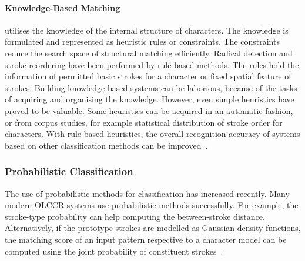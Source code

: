 \paragraph{Knowledge-Based Matching} utilises the knowledge of the internal 
structure of characters. The knowledge is formulated and represented as heuristic
rules or constraints. The constraints reduce the search space of structural 
matching efficiently. Radical detection and stroke reordering have been performed
by rule-based methods. The rules hold the information of permitted basic strokes
for a character or fixed spatial feature of strokes.
Building knowledge-based systems can be laborious, because of the tasks of 
acquiring and organising the knowledge. However, even simple heuristics have
proved to be valuable. Some heuristics can be acquired in an automatic fashion,
or from corpus studies, for example statistical distribution of stroke order for
characters. With rule-based heuristics, the overall recognition accuracy of
systems based on other classification methods can be 
improved~.

\subsubsection{Probabilistic Classification}
\label{sec:olccr:probabilisticclassification}

The use of probabilistic methods for classification has increased recently. Many modern 
OLCCR systems use probabilistic methods successfully. For example, the stroke-type
probability can help computing the between-stroke distance. Alternatively,
if the prototype strokes are modelled as Gaussian density functions, the 
matching score of an input pattern respective to a character model can be 
computed using the joint probability of constituent 
strokes~.

